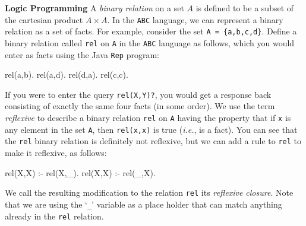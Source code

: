 \begin{minipage}[t]{\sw}
\slidenumber
\LARGE
{\bf Logic Programming}\exx
A {\em binary relation} on a set $A$
is defined to be a subset of the cartesian product $A \times A$.
In the \verb'ABC' language, we can represent a binary relation
as a set of facts.
For example, consider the set \verb'A = {a,b,c,d}'.
Define a binary relation called \verb'rel' on \verb'A'
in the \verb'ABC' language as follows,
which you would enter as facts using the Java \verb'Rep' program:
{\Large
\begin{qv}
rel(a,b).
rel(a,d).
rel(d,a).
rel(c,c).
\end{qv}
}
If you were to enter the query \verb'rel(X,Y)?',
you would get a response back consisting
of exactly the same four facts (in some order).\exx
We use the term {\em reflexive}
to describe a binary relation \verb'rel' on \verb'A' having the property
that if \verb'x' is any element in the set \verb'A',
then \verb'rel(x,x)' is true ({\em i.e.}, is a fact).
You can see that the \verb'rel' binary relation
is definitely not reflexive,
but we can add a rule to \verb'rel' to make it reflexive,
as follows:
{\Large
\begin{qv}
rel(X,X) :- rel(X,_).
rel(X,X) :- rel(_,X).
\end{qv}
}
We call the resulting modification to the relation \verb'rel'
its {\em reflexive closure}.
Note that we are using the `\verb'_'' variable as a place holder
that can match anything already in the \verb'rel' relation.
\end{minipage}
